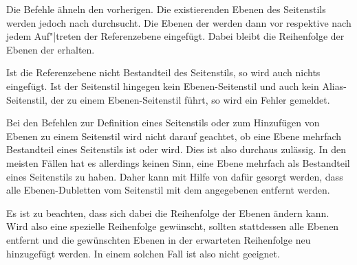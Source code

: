 \begin{Declaration}
\end{Declaration}
%
%
\iffalse%
Diese beiden Befehle ähneln den vorangegangenen. Allerdings wird hier
zusätzlich ein \PName{Referenzebenen-Name} angegeben. Die Ebenen des über den
\PName{Seitenstil-Name} angegebenen Seitenstils werden nach dieser
Referenzebene durchsucht. %
\else%
Die Befehle ähneln den vorherigen. Die existierenden Ebenen des Seitenstils
werden jedoch nach  durchsucht. %
\fi%
Die Ebenen der  werden dann
vor
respektive nach jedem Auf"|treten der Referenzebene %
%
eingefügt. Dabei bleibt die Reihenfolge der Ebenen der
 erhalten.

Ist die Referenzebene nicht Bestandteil des Seitenstils, so wird auch nichts
eingefügt. Ist der Seitenstil hingegen kein Ebenen-Seitenstil und auch kein
Alias-Seitenstil, der zu einem Ebenen-Seitenstil führt, so wird ein Fehler
gemeldet.%
\EndIndexGroup


\begin{Declaration}
\end{Declaration}
%
%
Bei den Befehlen zur Definition eines Seitenstils oder zum Hinzufügen von
Ebenen zu einem Seitenstil wird nicht darauf geachtet, ob eine Ebene mehrfach
Bestandteil eines Seitenstils ist oder wird. Dies ist also durchaus
zulässig. In den meisten Fällen hat es allerdings keinen Sinn, eine Ebene
mehrfach als Bestandteil eines Seitenstils zu haben. Daher kann mit Hilfe von
 dafür gesorgt werden, dass alle
Ebenen-Dubletten vom Seitenstil mit dem angegebenen 
entfernt werden.

Es ist zu beachten, dass sich dabei die Reihenfolge der
Ebenen ändern kann. Wird also eine spezielle Reihenfolge gewünscht, sollten
stattdessen alle Ebenen entfernt und die gewünschten Ebenen in der erwarteten
Reihenfolge neu hinzugefügt werden. In einem solchen Fall ist
 also nicht geeignet.%
\EndIndexGroup


